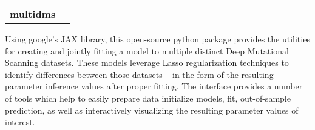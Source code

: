 \documentclass[letterpaper,11pt]{article}
\makeatletter
\let\oldhref\href
\renewcommand{\href}[2]{\oldhref{#1}{\bfseries#2}}
\newcommand{\resumeSoftwareSubheading}[3]{
  \vspace{-1pt}\item
    \begin{tabular*}{0.97\textwidth}[t]{l@{\extracolsep{\fill}}r}
      \textbf{#1}\label{#1} & #2 \\
    \end{tabular*}\vspace{-6pt}
    \begin{center}
    \begin{minipage}{0.87\textwidth}
    \linespread{0.80}\selectfont
        \small#3
    \end{minipage}\vspace{-5pt}
    \end{center}
}
\makeatother
\begin{document}
    \resumeSoftwareSubheading{multidms}
        {
            \href{https://matsengrp.github.io/multidms/}{\faGlobe}
            \href{https://www.biorxiv.org/content/10.1101/2023.07.31.551037v1}{\faNewspaper}
            \href{https://github.com/matsengrp/multidms}{\faCode}
        }
        {
            Using google's JAX library, this open-source python package 
            provides the utilities for creating and jointly fitting 
            a model to multiple distinct Deep Mutational Scanning datasets.
            These models leverage Lasso regularization techniques to
            identify differences between those datasets -- in the form 
            of the resulting parameter inference values after proper fitting.
            The interface provides a number of tools which help to easily prepare data
            initialize models, fit, out-of-sample prediction, 
            as well as interactively visualizing 
            the resulting parameter values of interest.
        }            
\end{document}
